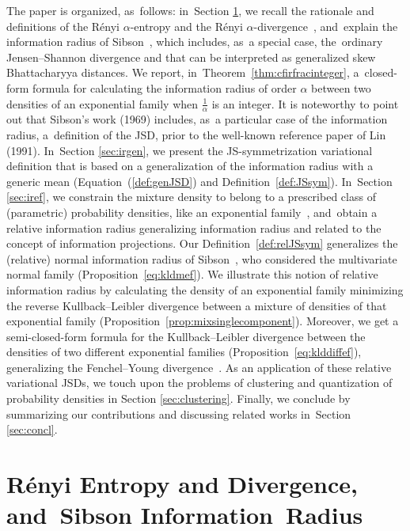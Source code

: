 \documentclass[entropy,article,accept,oneauthor,pdftex,entropy]{Definitions/mdpi}
\begin{document}
The paper is organized, as~follows: in~Section \ref{sec:ir}, we recall the rationale and definitions of the R\'enyi $\alpha$-entropy and the R\'enyi $\alpha$-divergence~\cite{Renyi-1961}, and~explain the information radius of Sibson~\cite{Sibson-1969}, which includes, as~a special case, the~ordinary Jensen--Shannon divergence and that can be interpreted as generalized skew Bhattacharyya distances. 
We report, in~Theorem~\ref{thm:cfirfracinteger}, a~closed-form formula for calculating the information radius of order $\alpha$ between two densities of an exponential family when $\frac{1}{\alpha}$ is an integer.
It is noteworthy to point out that Sibson's work (1969) includes, as~a particular case of the information radius, a~definition of the JSD, prior to the well-known reference paper of Lin~\cite{JS-1991} (1991).
In~Section \ref{sec:irgen}, we present the JS-symmetrization variational definition that is based on a generalization of the information radius with a  generic mean (Equation~(\ref{def:genJSD}) and Definition~\ref{def:JSsym}).
In~Section \ref{sec:iref}, we constrain the mixture density to belong to a prescribed class of (parametric) probability densities, like an exponential family~\cite{EF-2014}, and~obtain a relative information radius generalizing information radius and related to the concept of information projections.
Our Definition~\ref{def:relJSsym} generalizes the (relative) normal information radius of Sibson~\cite{Sibson-1969}, who considered the multivariate normal family (Proposition~\ref{eq:kldmef}). 
We illustrate this notion of relative information radius by calculating the density of an exponential family minimizing 
the reverse Kullback--Leibler divergence between a mixture of densities
 of that exponential family  (Proposition~\ref{prop:mixsinglecomponent}).  
Moreover, we get a semi-closed-form formula for the Kullback--Leibler divergence between the densities of two different exponential families
 (Proposition~\ref{eq:klddiffef}), generalizing the Fenchel--Young divergence~\cite{FenchelYoung-2020}. 
As an application of these relative variational JSDs, we touch upon the problems of clustering and quantization of probability densities in Section \ref{sec:clustering}.
Finally, we conclude by summarizing our contributions and discussing related works in~Section \ref{sec:concl}.




\section{R\'enyi Entropy and Divergence, and~Sibson Information~Radius}\label{sec:ir}
\end{document}
